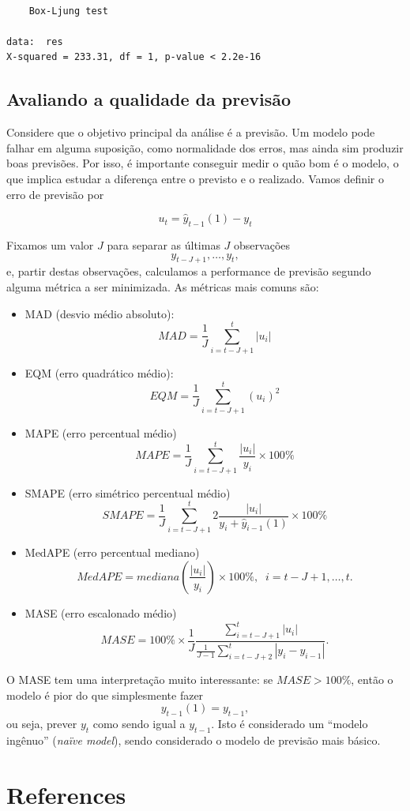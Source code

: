 \documentclass[
  letterpaper,
  DIV=11,
  numbers=noendperiod]{scrreprt}
\providecommand{\tightlist}{%
  \setlength{\itemsep}{0pt}\setlength{\parskip}{0pt}}\usepackage{longtable,booktabs,array}
\newlength{\cslhangindent}
\newlength{\cslentryspacingunit} %
\newenvironment{CSLReferences}[2] %
 {%
  \setlength{\parindent}{0pt}
  \ifodd #1
  \let\oldpar\par
  \def\par{\hangindent=\cslhangindent\oldpar}
  \fi
  \setlength{\parskip}{#2\cslentryspacingunit}
 }%
 {}
\theoremstyle{plain}
\theoremstyle{definition}
\theoremstyle{definition}
\theoremstyle{remark}
\begin{document}
\begin{verbatim}

    Box-Ljung test

data:  res
X-squared = 233.31, df = 1, p-value < 2.2e-16
\end{verbatim}

\hypertarget{avaliando-a-qualidade-da-previsuxe3o}{%
\section{Avaliando a qualidade da
previsão}\label{avaliando-a-qualidade-da-previsuxe3o}}

Considere que o objetivo principal da análise é a previsão. Um modelo
pode falhar em alguma suposição, como normalidade dos erros, mas ainda
sim produzir boas previsões. Por isso, é importante conseguir medir o
quão bom é o modelo, o que implica estudar a diferença entre o previsto
e o realizado. Vamos definir o erro de previsão por

\[u_{t} =\hat{y}_{t-1}(1)-y_{t}\]

Fixamos um valor \(J\) para separar as últimas \(J\) observações
\[y_{t-J+1},\ldots,y_{t},\] e, partir destas observações, calculamos a
performance de previsão segundo alguma métrica a ser minimizada. As
métricas mais comuns são:

\begin{itemize}
\tightlist
\item
  MAD (desvio médio absoluto):
  \[MAD = \frac{1}{J}\sum_{i=t-J+1}^t |u_i|\]
\item
  EQM (erro quadrático médio):
  \[EQM = \frac{1}{J}\sum_{i=t-J+1}^t (u_i)^2\]
\item
  MAPE (erro percentual médio)
  \[MAPE = \frac{1}{J}\sum_{i=t-J+1}^t \frac{|u_i|}{y_i}\times 100\%\]
\item
  SMAPE (erro simétrico percentual médio)
  \[SMAPE = \frac{1}{J}\sum_{i=t-J+1}^t 2\frac{|u_i|}{y_i+\hat{y}_{i-1}(1)}\times 100\%\]
\item
  MedAPE (erro percentual mediano)
  \[MedAPE = mediana\left(\frac{|u_i|}{y_i}\right) \times 100\%,\;\;i=t-J+1,\ldots,t.\]
\item
  MASE (erro escalonado médio)
  \[MASE = 100\%\times\frac{1}{J} \frac{\sum_{i = t-J+1}^t|u_i|}{\frac{1}{J-1}\sum_{i=t-J+2}^t |y_i - y_{i-1}|}.\]
\end{itemize}

O MASE tem uma interpretação muito interessante: se \(MASE>100\%\),
então o modelo é pior do que simplesmente fazer \[y_{t-1}(1)=y_{t-1},\]
ou seja, prever \(y_t\) como sendo igual a \(y_{t-1}\). Isto é
considerado um ``modelo ingênuo'' (\emph{naïve model}), sendo
considerado o modelo de previsão mais básico.


\hypertarget{references}{%
\chapter*{References}\label{references}}


\hypertarget{refs}{}
\begin{CSLReferences}{0}{0}
\end{CSLReferences}
\end{document}
